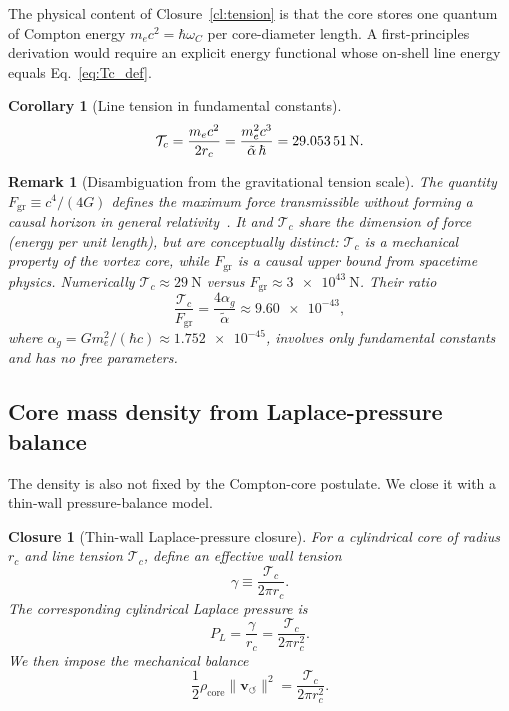 \documentclass[aps,pra,preprint,longbibliography,nofootinbib]{revtex4-2}
\newtheorem{corollary}{Corollary}
\newtheorem{remark}{Remark}
\newtheorem{closure}{Closure}
\newcommand{\vnorm}{\lVert\mathbf{v}_{\!\boldsymbol{\circlearrowleft}}\rVert} %
\newcommand{\rhocore}{\rho_{\mathrm{core}}}      %
\newcommand{\rc}{r_c}                            %
\newcommand{\Tc}{\mathcal{T}_c}                  %
\newcommand{\Fgr}{F_{\mathrm{gr}}}              %
\begin{document}
The physical content of Closure~\ref{cl:tension} is that the core stores
one quantum of Compton energy $m_e c^2=\hbar\omega_C$ per core-diameter
length.  A first-principles derivation would require an explicit
energy functional whose on-shell line energy equals Eq.~\eqref{eq:Tc_def}.

\begin{corollary}[Line tension in fundamental constants]
\label{cor:Tc}
\begin{equation}
  \Tc = \frac{m_e c^2}{2\rc}
      = \frac{m_e^2 c^3}{\tilde\alpha\,\hbar}
      = \SI{29.053\,51}{\newton}.
  \label{eq:Tc}
\end{equation}
\end{corollary}

\begin{remark}[Disambiguation from the gravitational tension scale]
\label{rem:Fgr}
The quantity $\Fgr \equiv c^4/(4G)$ defines the maximum force
transmissible without forming a causal horizon in general
relativity~\cite{Gibbons2002,Schiller2006}.
It and $\Tc$ share the dimension of force (energy per unit length),
but are conceptually distinct:
$\Tc$ is a mechanical property of the vortex core, while $\Fgr$ is
a causal upper bound from spacetime physics.
Numerically $\Tc \approx \SI{29}{\newton}$ versus
$\Fgr \approx \SI{3e43}{\newton}$.
Their ratio
\begin{equation}
  \frac{\Tc}{\Fgr} = \frac{4\alpha_g}{\tilde\alpha}
                   \approx \num{9.60e-43},
  \label{eq:tension_ratio}
\end{equation}
where $\alpha_g = Gm_e^2/(\hbar c) \approx \num{1.752e-45}$,
involves only fundamental constants and has no free parameters.
\end{remark}

\subsection{Core mass density from Laplace-pressure balance}
\label{sec:rhocore}

The density is also not fixed by the Compton-core postulate.  We close
it with a thin-wall pressure-balance model.

\begin{closure}[Thin-wall Laplace-pressure closure]
\label{cl:laplace}
For a cylindrical core of radius $\rc$ and line tension $\Tc$, define an
effective wall tension
\begin{equation}
  \gamma \equiv \frac{\Tc}{2\pi\rc}.
  \label{eq:wall_tension}
\end{equation}
The corresponding cylindrical Laplace pressure is
\begin{equation}
  P_L = \frac{\gamma}{\rc} = \frac{\Tc}{2\pi\rc^2}.
  \label{eq:Laplace}
\end{equation}
We then impose the mechanical balance
\begin{equation}
  \frac{1}{2}\rhocore\vnorm^2 = \frac{\Tc}{2\pi\rc^2}.
  \label{eq:pressure_balance}
\end{equation}
\end{closure}
\end{document}
